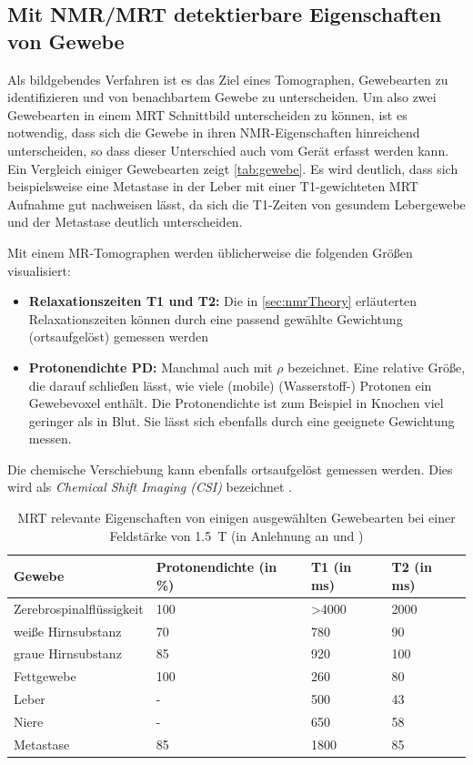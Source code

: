 \subsection{Mit NMR/MRT detektierbare Eigenschaften von Gewebe}
Als bildgebendes Verfahren ist es das Ziel eines Tomographen, Gewebearten zu identifizieren und von benachbartem Gewebe zu unterscheiden. Um also zwei Gewebearten in einem MRT Schnittbild unterscheiden zu können, ist es notwendig, dass sich die Gewebe in ihren NMR-Eigenschaften hinreichend unterscheiden, so dass dieser Unterschied auch vom Gerät erfasst werden kann. Ein Vergleich einiger Gewebearten zeigt \autoref{tab:gewebe}. Es wird deutlich, dass sich beispielsweise eine Metastase in der Leber mit einer T1-gewichteten MRT Aufnahme gut nachweisen lässt, da sich die T1-Zeiten von gesundem Lebergewebe und der Metastase deutlich unterscheiden.

Mit einem MR-Tomographen werden üblicherweise die folgenden Größen visualisiert:
\begin{itemize}
	\item \textbf{Relaxationszeiten T1 und T2:} Die in \autoref{sec:nmrTheory} erläuterten Relaxationszeiten können durch eine passend gewählte Gewichtung (ortsaufgelöst) gemessen werden
	\item \textbf{Protonendichte PD:} Manchmal auch mit \textbf{$\rho$} bezeichnet. Eine relative Größe, die darauf schließen lässt, wie viele (mobile) (Wasserstoff-) Protonen ein Gewebevoxel enthält. Die Protonendichte ist zum Beispiel in Knochen viel geringer als in Blut. Sie lässt sich ebenfalls durch eine geeignete Gewichtung messen.  
\end{itemize}

Die chemische Verschiebung kann ebenfalls ortsaufgelöst gemessen werden. Dies wird als \textit{Chemical Shift Imaging (CSI)} bezeichnet \cite{Keevil2006}.

\begin{table}[H]
	\centering
	\caption[MRT relevante Eigenschaften ausgewählter Gewebe]{MRT relevante Eigenschaften von einigen ausgewählten Gewebearten bei einer Feldstärke von \SI{1.5}{\tesla} (in Anlehnung an \cite[S.~16]{Weishaupt2014} und \cite[S.~17]{Reiser2008})}
	\label{tab:gewebe}
	\begin{tabular}{llll}
		\toprule
		\textbf{Gewebe} & \textbf{Protonendichte (in \%)} & \textbf{T1 (in ms)} & \textbf{T2 (in ms)} \\
		\midrule
		Zerebrospinalflüssigkeit & 100 & \textgreater4000 & 2000 \\
		weiße Hirnsubstanz & 70 & 780 & 90 \\
		graue Hirnsubstanz & 85 & 920 & 100 \\
		Fettgewebe & 100 & 260 & 80 \\
		Leber & - & 500 & 43 \\
		Niere & - & 650 & 58 \\
		Metastase & 85 & 1800 & 85 \\
		\bottomrule
	\end{tabular}
\end{table}

